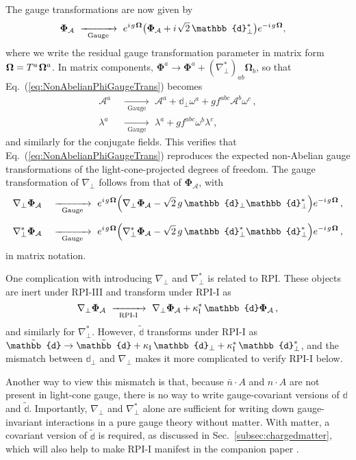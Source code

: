 \documentclass[12pt,document,nofootinbib,superscriptaddress,onecolumn,preprintnumbers,balancelastpage]{article}
\newcommand{\rpii}{{\kappa_\text{I}}}
\newcommand{\s}{\hspace{0.8pt}}
\newcommand{\PP}{\mathbb{d}}
\newcommand{\RPIi}{\,\,\xrightarrow[\hspace{5pt}\text{RPI-I}\hspace{5pt}]{}\,\,}
\newcommand{\gauge}{\,\,\xrightarrow[\hspace{5pt}\text{Gauge}\hspace{5pt}]{}\,\,}
\DeclareRobustCommand{\Sec}[1]{Sec.~\ref{#1}}
\DeclareRobustCommand{\Eq}[1]{Eq.~(\ref{#1})}
\newcommand{\RCA}{\boldsymbol{\Omega}}
\newcommand{\alc}{\mathcal{A}}
\newcommand{\bPhiA}{\bold \Phi_{\alc}}
\newcommand{\bPhi}{\boldsymbol{\Phi}}
\newcommand{\bPhialc}{ \bold \Phi_\alc}
\begin{document}
\begin{spacing}{1.2}
The gauge transformations are now given by
\begin{align}
\label{eq:NonAbelianPhiGaugeTrans}
\bPhialc &\gauge e^{i\s g\s \RCA} \big(\bPhiA + i\s \sqrt{2}\, \PP_\perp^* \big) e^{-i\s g\s \RCA}, 
\end{align}
where we write the residual gauge transformation parameter in matrix form $\RCA = T^a \s \RCA^a$.
%
In matrix components,  $\bPhi^a \rightarrow \bPhi^a + (\nabla_\perp^*)_{ab} \RCA_b$, so that \Eq{eq:NonAbelianPhiGaugeTrans} becomes
\begin{align}
\alc^a &\gauge \alc^a +  \PP_\perp \omega^a  + g f^{abc} \alc^b \omega^c \,, \\
 \lambda^a &\gauge \lambda^a + g f^{abc} \omega^b \lambda^c,
\end{align}
and similarly for the conjugate fields.
%
This verifies that \Eq{eq:NonAbelianPhiGaugeTrans} reproduces the expected non-Abelian gauge transformations of the light-cone-projected degrees of freedom.
% 
The gauge transformation of $\nabla_\perp$ follows from that of $\bPhi_\alc$, with
\begin{alignat}{2}
\nabla_\perp \bPhialc &&\gauge e^{i\s g\s \RCA} \Big(\nabla_\perp \bPhiA - \sqrt{2} \, g \,\PP_\perp \PP_\perp^*  \Big) e^{-i\s g\s \RCA} \,, \notag\\[5pt]
\nabla_\perp^* \bPhialc &&\gauge e^{i\s g\s \RCA} \Big(\nabla_\perp^* \bPhiA -\sqrt{2} \,g \,\PP_\perp^* \PP_\perp^* \Big) e^{-i\s g\s \RCA} \,,
\label{eq:nabla_def_nonAbelian}
\end{alignat}
in matrix notation. 



One complication with introducing $\nabla_\perp$ and $\nabla_\perp^*$ is related to RPI.
%
These objects are inert under RPI-III and transform under RPI-I as
%
\begin{equation}
\label{eq:nablaperp_rpii}
\nabla_\perp  \bPhialc \RPIi  \nabla_\perp  \bPhialc + \kappa_{\rm I}^*\, \PP  \bPhialc \,,
\end{equation}
%
and similarly for $\nabla_\perp^*$.
%
However, $\tilde{\PP}$ transforms under RPI-I as $\tilde{\PP} \to \tilde{\PP} + \rpii\, \PP_\perp+\kappa_{\rm I}^*\, \PP^*_\perp$, and the mismatch between $\PP_\perp$ and $\nabla_\perp$ makes it more complicated to verify RPI-I below.


Another way to view this mismatch is that, because $\bar{n}\cdot A$ and $n\cdot A$ are not present in light-cone gauge, there is no way to write gauge-covariant versions of $\PP$ and $\tilde{\PP}$. 
%
Importantly, $\nabla_\perp$ and $\nabla_\perp^*$ alone are sufficient for writing down gauge-invariant interactions in a pure gauge theory without matter.
%
With matter, a covariant version of $\tilde{\PP}$ is required, as discussed in \Sec{subsec:chargedmatter}, which will also help to make RPI-I manifest in the companion paper \cite{Cohen:2019gsc}.



\end{spacing}
\end{document}
